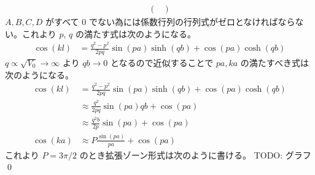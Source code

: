 \documentclass[uplatex,dvipdfmx,a4paper,11pt]{jlreq}
\makeatletter
\numberwithin{equation}{section}
\theoremstyle{definition}
\renewenvironment{proof}[1][\proofname]{\par
  \normalfont
  \topsep6\p@\@plus6\p@ \trivlist
  \item[\hskip\labelsep{\bfseries #1}\@addpunct{\bfseries}]\ignorespaces\quad\par
}{%
  \qed\endtrivlist\@endpefalse
}
\renewcommand\proofname{証明}
\makeatother
\begin{document}
\begin{proof}
\begin{align}
\begin{pmatrix}
    \end{pmatrix}
  \end{align}
  $A, B, C, D$ がすべて 0 でない為には係数行列の行列式がゼロとなければならない。これより $p$, $q$ の満たす式は次のようになる。
  \begin{align}
    \cos(kl) & = \frac{q^2 - p^2}{2pq}\sin(pa)\sinh(qb) + \cos(pa)\cosh(qb)
  \end{align}
  $q \propto \sqrt{V_0} \to \infty$ より $qb\to 0$ となるので近似することで $pa, ka$ の満たすべき式は次のようになる。
  \begin{align}
    \cos(kl) & = \frac{q^2 - p^2}{2pq}\sin(pa)\sinh(qb) + \cos(pa)\cosh(qb) \\
             & \approx \frac{q^2}{2pq}\sin(pa)qb + \cos(pa)                 \\
             & \approx \frac{q^2b}{2p}\sin(pa) + \cos(pa)                   \\
    \cos(ka) & \approx P\frac{\sin(pa)}{pa} + \cos(pa)
  \end{align}
  これより $P = 3\pi/2$ のとき拡張ゾーン形式は次のように書ける。
  TODO: グラフ
\end{proof}

\clearpage

\setcounter{subsection}{8}
\end{document}
